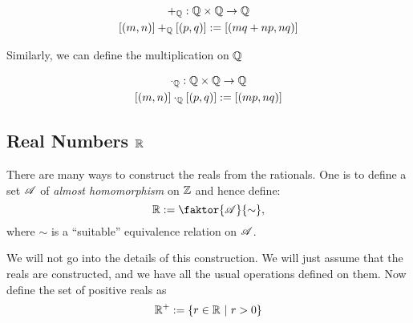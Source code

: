 \begin{definition}[Addition on \(\Q\)]
	\begin{equation}
		\begin{gathered}
			+_{\mathbb Q}: \mathbb Q \times \mathbb Q \to \mathbb Q \\
			[(m, n)] +_{\mathbb Q} [(p, q)] := [(m q + n p, n q)]
		\end{gathered}
	\end{equation}
\end{definition}
Similarly, we can define the multiplication on \(\Q\)
\begin{definition}[Multiplication on \(\Q\)]
	\begin{equation}
		\begin{gathered}
			\cdot_{\mathbb Q}: \mathbb Q \times \mathbb Q \to \mathbb Q \\
			[(m, n)] \cdot_{\mathbb Q} [(p, q)] := [(m p, n q)]
		\end{gathered}
	\end{equation}
\end{definition}

\subsection[Real Numbers]{Real Numbers \(\mathbb R\)}
There are many ways to construct the reals from the rationals. One is to define a set $\mathscr{A}$ of \emph{almost homomorphism} on $\mathbb Z$ and hence define:
\begin{equation}
	\R := \faktor{\A}{\sim},
\end{equation}
where $\sim$ is a ``suitable'' equivalence relation on $\mathscr{A}$.

We will not go into the details of this construction. We will just assume that the reals are constructed, and we have all the usual operations defined on them. Now define the set of positive reals as
\begin{equation}
	\mathbb R^+ := \qty{r \in \mathbb R\ \middle|\ r > 0}
\end{equation}

